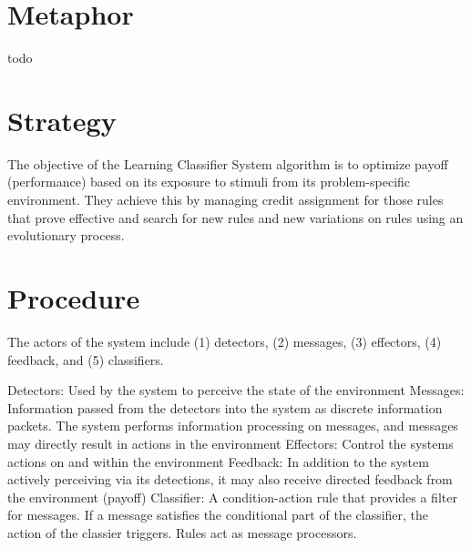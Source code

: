 \documentclass[a4paper, 11pt]{article}
\begin{document}
\section{Metaphor}
\label{sec:metaphor}
todo

\section{Strategy}
\label{sec:strategy}
The objective of the Learning Classifier System algorithm is to optimize payoff (performance) based on its exposure to stimuli from its problem-specific  environment.
They achieve this by managing credit assignment for those rules that prove effective and search for new rules and new variations on rules using an evolutionary process.

\section{Procedure}
\label{sec:procedure}


The actors of the system include (1) detectors, (2) messages, (3) effectors, (4) feedback, and (5) classifiers.

Detectors: Used by the system to perceive the state of the environment Messages: Information passed from the detectors into the system as discrete information packets. The system performs information processing on messages, and messages may directly result in actions in the environment Effectors: Control the systems actions on and within the environment Feedback: In addition to the system actively perceiving via its detections, it may also receive directed feedback from the environment (payoff) Classifier: A condition-action rule that provides a filter for messages. If a message satisfies the conditional part of the classifier, the action of the classier triggers. Rules act as message processors.
\end{document}
